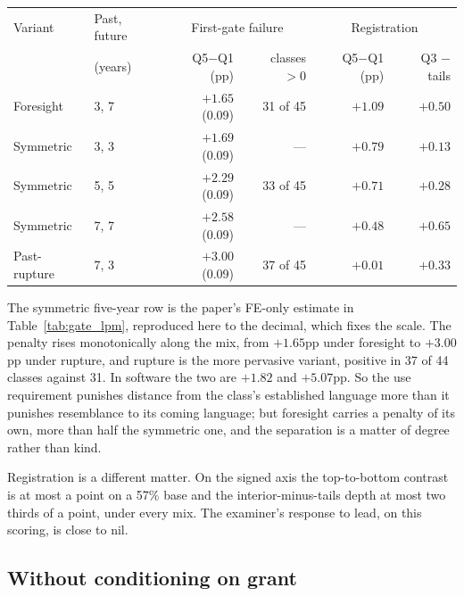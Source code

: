 \begin{center}\small
\begin{tabular}{llrrrr}
\toprule
Variant & Past, future & \multicolumn{2}{c}{First-gate failure} & \multicolumn{2}{c}{Registration} \\
 & (years) & Q5$-$Q1 (pp) & classes $>0$ & Q5$-$Q1 (pp) & Q3 $-$ tails \\
\midrule
Foresight     & 3, 7 & $+1.65$ (0.09) & 31 of 45 & $+1.09$ & $+0.50$ \\
Symmetric     & 3, 3 & $+1.69$ (0.09) & ---      & $+0.79$ & $+0.13$ \\
Symmetric     & 5, 5 & $+2.29$ (0.09) & 33 of 45 & $+0.71$ & $+0.28$ \\
Symmetric     & 7, 7 & $+2.58$ (0.09) & ---      & $+0.48$ & $+0.65$ \\
Past-rupture  & 7, 3 & $+3.00$ (0.09) & 37 of 45 & $+0.01$ & $+0.33$ \\
\bottomrule
\end{tabular}
\end{center}

\noindent The symmetric five-year row is the paper's FE-only estimate in
Table~\ref{tab:gate_lpm}, reproduced here to the decimal, which fixes the
scale. The penalty rises monotonically along the mix, from $+1.65$pp under
foresight to $+3.00$pp under rupture, and rupture is the more pervasive
variant, positive in 37 of 44 classes against 31. In software the two are
$+1.82$ and $+5.07$pp. So the use requirement punishes distance from the
class's established language more than it punishes resemblance to its
coming language; but foresight carries a penalty of its own, more than half
the symmetric one, and the separation is a matter of degree rather than
kind.

Registration is a different matter. On the signed axis the top-to-bottom
contrast is at most a point on a 57\% base and the interior-minus-tails
depth at most two thirds of a point, under every mix. The examiner's
response to lead, on this scoring, is close to nil.

\subsection{Without conditioning on grant}\label{sec:robust_uncond}

